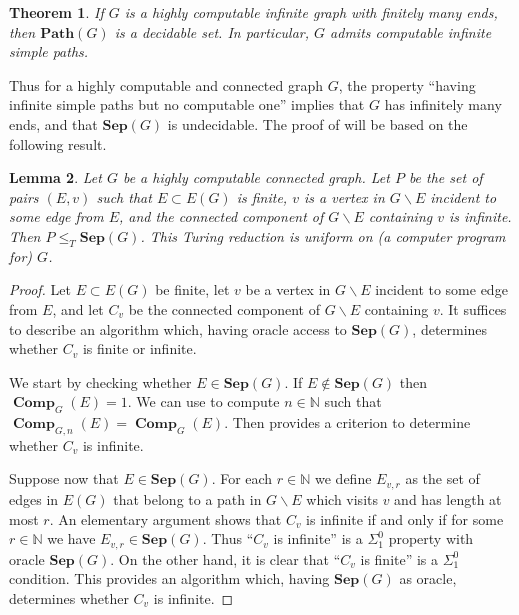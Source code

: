 \documentclass[10pt,A4]{amsart}
\newtheorem{thm}{Theorem}[section]
\newtheorem{lem}[thm]{Lemma}
\theoremstyle{definition}
\theoremstyle{definition}
\newcommand{\N}{\mathbb{N}}
\newcommand{\sep}[1]{\mathbf{Sep}({#1})}
\newcommand{\Path}[1]{\mathbf{Path}({#1})}
\newcommand{\comp}{\operatorname{\mathbf{Comp}}}
\begin{document}
\begin{thm}\label{paths-is-decidable-for-finitely-many-ends}
     If $G$ is a highly computable infinite graph with finitely many ends, then $\Path{G}$ is a decidable set. In particular,  $G$ admits computable infinite simple paths. 
\end{thm}
Thus for a highly computable and connected graph $G$, the property ``having infinite simple paths but no computable one'' implies that $G$ has infinitely many ends, and that $\sep{G}$ is undecidable. The proof of  will be based on the following result. 

\begin{lem}\label{sep-y-vecinos}
    Let $G$ be a highly computable connected graph. Let $P$ be the set of pairs $(E,v)$ such that $E\subset E(G)$ is finite, $v$ is a vertex in $G\smallsetminus E$ incident to some edge from $E$, and the connected component of $G\smallsetminus E$ containing $v$ is infinite. Then $P\leq_T\sep{G}$. This Turing reduction is uniform on (a computer program for) $G$.
\end{lem}
\begin{proof}
Let $E\subset E(G)$ be finite, let $v$ be a vertex in $G\smallsetminus E$ incident to some edge from $E$, and let $C_v$ be the connected component of $G\smallsetminus E$ containing $v$. It suffices to describe an algorithm which, having oracle access to $\sep{G}$, determines whether $C_v$ is finite or infinite. 

We start by checking whether $E\in \sep{G}$. If $E\not\in\sep{G}$ then  $\comp_{G}(E)=1$. We can use  to compute $n\in\N$ such that $\comp_{G,n}(E)=\comp_{G}(E)$. Then  provides a criterion to determine whether $C_v$ is infinite.

Suppose now that $E\in\sep{G}$. For each $r\in\N$ we define $E_{v,r}$ as the set of edges in $E(G)$ that belong to a path in $G\smallsetminus E$ which visits $v$ and has length at most $r$. An elementary argument shows that $C_v$ is infinite if and only if for some $r\in \N$ we have $E_{v,r}\in\sep{G}$. Thus ``$C_v$ is infinite'' is a $\Sigma_1^0$ property with oracle $\sep{G}$. On the other hand, it is clear that ``$C_v$ is finite'' is a $\Sigma_1^0$ condition. This provides an algorithm which, having $\sep{G}$ as oracle, determines whether $C_v$ is infinite.
\end{proof}
\end{document}
